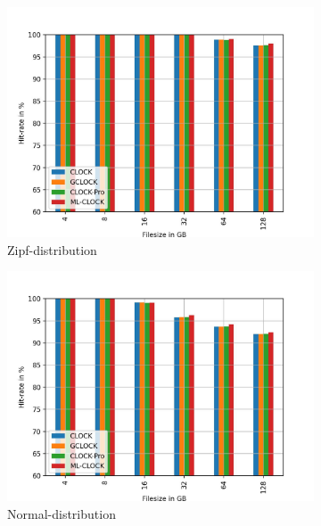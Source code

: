 \documentclass[
	12pt,
	a4paper,
	abstract,
	bibliography=totoc,
	chapterprefix,
	headings=openright,
	numbers=endperiod,
	parskip=half,
	twoside,
]{scrreprt}
\begin{document}

\begin{figure}
	\centering
	\begin{subfigure}{0.4\textwidth}
		\includegraphics[width=\textwidth]{rw_90to10_zipf.jpg}		
		\caption{Zipf-distribution}
		\label{fig:rw_90to10  zipf}
	\end{subfigure}
	\hfill
	\begin{subfigure}{0.4\textwidth}
		\includegraphics[width=\textwidth]{rw_90to10_normal.jpg}		
		\caption{Normal-distribution}
		\label{fig:rw_90to10  normal}
	\end{subfigure}
	\hfill
	\begin{subfigure}{0.4\textwidth}

\end{subfigure}
\end{figure}
\end{document}
